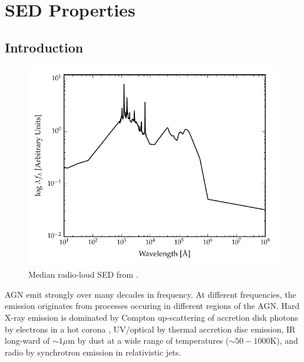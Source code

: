 
\chapter{SED Properties}
\label{ch:sed} 



\section{Introduction}

\begin{figure}
  \centering
  \includegraphics[width=\textwidth]{figures/chapter05/shangsed.pdf}
  \caption{Median radio-loud SED from \citet{shang11}.}
  \label{fig:seyfert_sed}
\end{figure}

AGN emit strongly over many decades in frequency. 
At different frequencies, the emission originates from processes occuring in different regions of the \ac{AGN}. 
Hard X-ray emission is dominated by Compton up-scattering of accretion disk photons by electrons in a hot corona \citep[e.g.][]{sunyaev80}, \ac{UV}/optical by thermal accretion disc emission, \ac{IR} long-ward of $\sim1\mu$m  by dust at a wide range of temperatures ($\sim50 - 1000$K), and radio by synchrotron emission in relativistic jets.   

